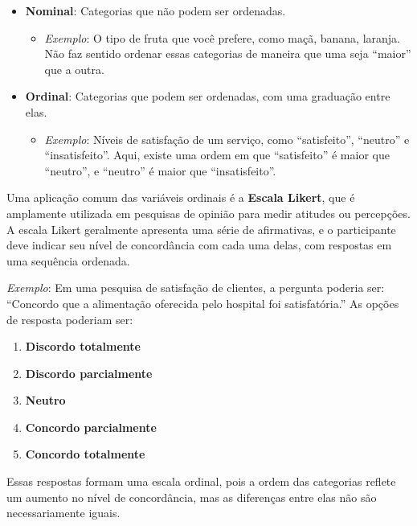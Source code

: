 \documentclass[
]{book}
\providecommand{\tightlist}{%
  \setlength{\itemsep}{0pt}\setlength{\parskip}{0pt}}
\begin{document}
\begin{itemize}
\tightlist
\item
  \textbf{Nominal}: Categorias que não podem ser ordenadas.

  \begin{itemize}
  \tightlist
  \item
    \emph{Exemplo}: O tipo de fruta que você prefere, como maçã, banana, laranja. Não faz sentido ordenar essas categorias de maneira que uma seja ``maior'' que a outra.
  \end{itemize}
\item
  \textbf{Ordinal}: Categorias que podem ser ordenadas, com uma graduação entre elas.

  \begin{itemize}
  \tightlist
  \item
    \emph{Exemplo}: Níveis de satisfação de um serviço, como ``satisfeito'', ``neutro'' e ``insatisfeito''. Aqui, existe uma ordem em que ``satisfeito'' é maior que ``neutro'', e ``neutro'' é maior que ``insatisfeito''.
  \end{itemize}
\end{itemize}

Uma aplicação comum das variáveis ordinais é a \textbf{Escala Likert}, que é amplamente utilizada em pesquisas de opinião para medir atitudes ou percepções. A escala Likert geralmente apresenta uma série de afirmativas, e o participante deve indicar seu nível de concordância com cada uma delas, com respostas em uma sequência ordenada.

\emph{Exemplo}: Em uma pesquisa de satisfação de clientes, a pergunta poderia ser: ``Concordo que a alimentação oferecida pelo hospital foi satisfatória.'' As opções de resposta poderiam ser:

\begin{enumerate}
\def\labelenumi{\arabic{enumi}.}
\tightlist
\item
  \textbf{Discordo totalmente}
\item
  \textbf{Discordo parcialmente}
\item
  \textbf{Neutro}
\item
  \textbf{Concordo parcialmente}
\item
  \textbf{Concordo totalmente}
\end{enumerate}

Essas respostas formam uma escala ordinal, pois a ordem das categorias reflete um aumento no nível de concordância, mas as diferenças entre elas não são necessariamente iguais.
\end{document}
